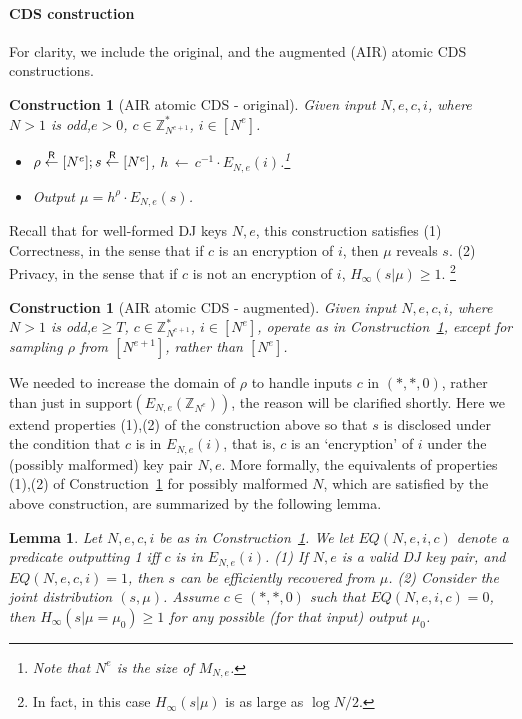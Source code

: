 \documentclass[11pt]{article}
\newtheorem{lemma}[theorem]{Lemma}
\newtheorem{construction}[theorem]{Construction}
\newcommand{\from}{{\,\leftarrow\,}}
\newcommand{\encdj}{{E}_{N,e}}
\newcommand{\Z}{\mathbb{Z}}
\newcommand{\U}[1]{\mathbb{Z}_{#1}^*}
\newcommand{\plain}{{{M}}}
\newcommand{\encr}[2]{E_{#1}(#2)}
\newcommand{\plaintext}[1]{\plain_{#1}}
\newcommand{\samp}[2]{#1\from #2}
\newcommand{\usamp}[2]{#1\stackrel{\footnotesize{\sf R}}{\leftarrow}#2}
\newcommand{\support}{{\mathrm{support}}}
\begin{document}
\paragraph{CDS construction}
For clarity, we include the original, and the augmented (AIR) atomic CDS constructions.
\begin{construction}[AIR atomic CDS - original]
\label{con-air-cds-orig}
Given input $N,e,c,i$, where $N>1$ is odd,$e>0$, $c\in \U{N^{e+1}}$, $i\in [N^e]$.
\begin{itemize}
  \item $\usamp{\rho}{[N^e]};\usamp{s}{[N^e]}$, $\samp{h}{c^{-1}\cdot \encr{N,e}{i}}$.\footnote{Note that $N^e$
    is the size of $\plaintext{N,e}$.}
    \item Output $\mu=h^{\rho}\cdot\encr{N,e}{s}$.
  \end{itemize}
\end{construction}
Recall that for well-formed DJ keys $N,e$, this construction satisfies (1) Correctness, in the sense that if $c$ is an encryption
of $i$, then $\mu$ reveals $s$. (2) Privacy, in the sense that if $c$ is not an encryption of $i$, $H_\infty(s|\mu)\geq 1$. \footnote{In fact, in this case $H_\infty(s|\mu)$ is as large as $\log{N}/2$.}
\begin{construction}[AIR atomic CDS - augmented]
  \label{con-air-cds-aug}
  Given input $N,e,c,i$, where $N>1$ is odd,$e\geq T$, $c\in \U{N^{e+1}}$, $i\in [N^e]$,
  operate as in Construction~\ref{con-air-cds-orig}, except for sampling $\rho$ from $[N^{e+1}]$,
  rather than $[N^e]$.
\end{construction}
We needed to increase the domain of $\rho$ to handle inputs $c$ in
$(*,*,0)$, rather than just in $\support(\encdj(\Z_{N^e}))$, the
reason will be clarified shortly. Here we extend properties (1),(2) of the construction above so that
$s$ is disclosed under the condition that $c$ is in $\encdj(i)$, that is,
$c$ is an `encryption' of $i$ under the (possibly malformed) key
pair $N,e$. More formally, the equivalents of properties (1),(2) of Construction~\ref{con-air-cds-orig} 
for possibly malformed $N$, which are satisfied by the above
construction, are summarized by the following lemma.
\begin{lemma}
  \label{lem-air-cds-priv}
  Let $N,e,c,i$ be as in Construction~\ref{con-air-cds-aug}. We
  let $EQ(N,e,i,c)$ denote a predicate outputting 1 iff $c$ is in $\encdj(i)$.
  (1) If $N,e$ is a valid DJ key pair, and $EQ(N,e,c,i)=1$, then $s$ can be efficiently recovered from $\mu$.
  (2) Consider the joint distribution $(s,\mu)$. Assume $c\in (*,*,0)$ such that $EQ(N,e,i,c)=0$,
  then $H_{\infty}(s|\mu=\mu_0) \geq 1$ for any possible (for that input) output $\mu_0$.
\end{lemma}
\end{document}

